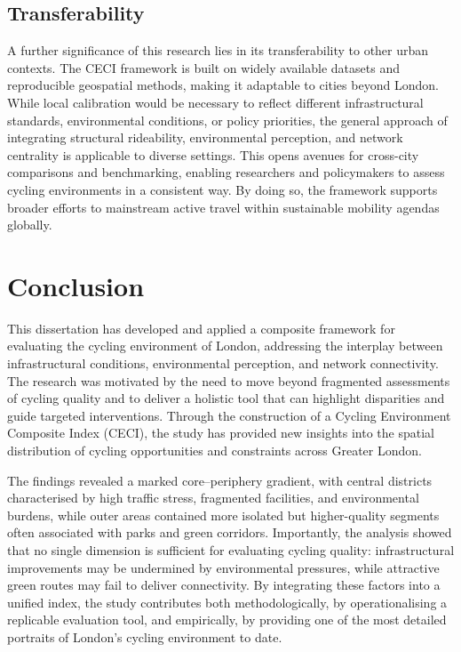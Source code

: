 \documentclass[
  12pt,
  oneside]{book}
\begin{document}
\section{Transferability}\label{transferability}

A further significance of this research lies in its transferability to other urban contexts. The CECI framework is built on widely available datasets and reproducible geospatial methods, making it adaptable to cities beyond London. While local calibration would be necessary to reflect different infrastructural standards, environmental conditions, or policy priorities, the general approach of integrating structural rideability, environmental perception, and network centrality is applicable to diverse settings. This opens avenues for cross-city comparisons and benchmarking, enabling researchers and policymakers to assess cycling environments in a consistent way. By doing so, the framework supports broader efforts to mainstream active travel within sustainable mobility agendas globally.

\chapter{Conclusion}\label{conclusion-1}

This dissertation has developed and applied a composite framework for evaluating the cycling environment of London, addressing the interplay between infrastructural conditions, environmental perception, and network connectivity. The research was motivated by the need to move beyond fragmented assessments of cycling quality and to deliver a holistic tool that can highlight disparities and guide targeted interventions. Through the construction of a Cycling Environment Composite Index (CECI), the study has provided new insights into the spatial distribution of cycling opportunities and constraints across Greater London.

The findings revealed a marked core--periphery gradient, with central districts characterised by high traffic stress, fragmented facilities, and environmental burdens, while outer areas contained more isolated but higher-quality segments often associated with parks and green corridors. Importantly, the analysis showed that no single dimension is sufficient for evaluating cycling quality: infrastructural improvements may be undermined by environmental pressures, while attractive green routes may fail to deliver connectivity. By integrating these factors into a unified index, the study contributes both methodologically, by operationalising a replicable evaluation tool, and empirically, by providing one of the most detailed portraits of London's cycling environment to date.
\end{document}
